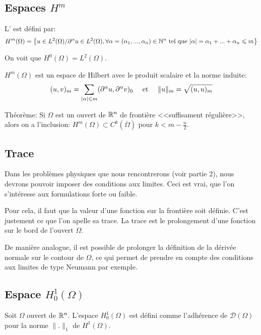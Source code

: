 \medskip
\subsection*{Espaces $H^m$}

L' est défini par:
\[
H^m(\Omega)=\left\{u\in L^2(\Omega)/ \partial^\alpha u\in L^2(\Omega),
\forall\alpha=(\alpha_1, ..., \alpha_n)\in\mathbb N^n \text{ tel que }|\alpha|=\alpha_1+...+\alpha_n\leqslant m
\right\}
\]

On voit que $H^0(\Omega)=L^2(\Omega)$.

\medskip
$H^m(\Omega)$ est un espace de Hilbert avec le produit scalaire et la norme induite:
\[
(u,v)_m=\displaystyle\sum_{|\alpha|\leqslant m}(\partial^\alpha u,\partial^\alpha v)_0 
\quad \text{ et } \quad
\|u\|_m=\sqrt{(u,u)_m}
\]

Théorème: Si $\Omega$ est un ouvert de $\mathbb R^n$ de frontière <<suffisament
régulière>>, alors on  a l'inclusion: $H^m(\Omega)\subset C^k(\overline{\Omega})$
pour $k<m-\frac{n}2$.

\medskip
\subsection*{Trace}

Dans les problèmes physiques que nous rencontrerons (voir partie 2), nous devrons
pouvoir imposer des conditions aux limites.
Ceci est vrai, que l'on s'intéresse aux formulations forte ou faible.

Pour cela, il faut que la valeur d'une fonction sur la frontière soit définie.
C'est justement ce que l'on apelle sa trace. 
La trace est le prolongement d'une fonction sur le bord de l'ouvert $\Omega$.

De manière analogue, il est possible de prolonger la définition de la dérivée normale
sur le contour de $\Omega$, ce qui permet de prendre en compte des conditions
aux limites de type Neumann par exemple.


\medskip
\subsection*{Espace $H^1_0(\Omega)$}

Soit $\Omega$ ouvert de $\mathbb R^n$. 
L'espace $H^1_0(\Omega)$ est défini comme l'adhérence de $\mathcal{D}(\Omega)$
pour la norme $\|.\|_ 1$ de $H^1(\Omega)$.

